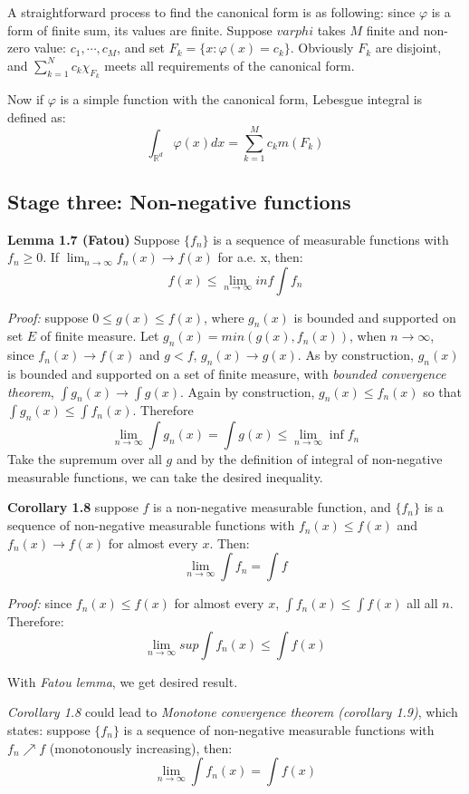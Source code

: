 \documentclass[
]{article}
\begin{document}
A straightforward process to find the canonical form is as following: since \(\varphi\) is a form of finite sum,
its values are finite. Suppose \(varphi\) takes \(M\) finite and non-zero value: \(c_1, \cdots, c_M\), and
set \(F_k=\{x: \varphi(x)=c_k\}\). Obviously \(F_k\) are disjoint, and \(\sum_{k=1}^Nc_k\chi_{F_k}\) meets all
requirements of the canonical form.

Now if \(\varphi\) is a simple function with the canonical form, Lebesgue integral is defined as:
\[\int_{\mathbb{R}^d}\varphi(x)dx=\sum_{k=1}^Mc_km(F_k)\]

\subsection{Stage three: Non-negative functions}
\textbf{Lemma 1.7 (Fatou)} Suppose \(\{f_n\}\) is a sequence of measurable functions with \(f_n \geq 0\). If 
\(\lim_{n\to\infty}f_n(x)\to f(x)\) for a.e. x, then:
\[f(x)\leq \lim_{n\to\infty}inf\int f_n\]

\textit{Proof:} suppose \(0\leq g(x) \leq f(x)\), where \(g_n(x)\) is bounded and supported on set \(E\)
of finite measure. Let \(g_n(x)=min(g(x), f_n(x))\), when \(n\to\infty\), since \(f_n(x)\to f(x)\) and \(g<f\),
\(g_n(x)\to g(x)\). As by construction, \(g_n(x)\) is bounded and supported on a set of finite measure, with \textit{bounded convergence theorem},
\(\int g_n(x)\to \int g(x)\). Again by construction, \(g_n(x)\leq f_n(x)\) so that \(\int g_n(x) \leq \int f_n(x)\). Therefore
\[
  \lim_{n\to\infty}\int g_n(x)=\int g(x) \leq \lim_{n\to\infty}\inf f_n
\]
Take the supremum over all \(g\) and by the definition of integral of non-negative measurable functions,
we can take the desired inequality.

\textbf{Corollary 1.8} suppose \(f\) is a non-negative measurable function, and \(\{f_n\}\) is a sequence
of non-negative measurable functions with \(f_n(x)\leq f(x)\) and \(f_n(x)\to f(x)\) for almost every \(x\). Then:
\[\lim_{n\to\infty}\int f_n = \int f\]

\textit{Proof:} since \(f_n(x)\leq f(x)\) for almost every \(x\), \(\int f_n(x)\leq \int f(x)\) all all \(n\). Therefore:
\[\lim_{n\to\infty}sup\int f_n(x)\leq\int f(x)\]

With \textit{Fatou lemma}, we get desired result.

\textit{Corollary 1.8} could lead to \textit{Monotone convergence theorem (corollary 1.9)}, which states: suppose
\(\{f_n\}\) is a sequence of non-negative measurable functions with \(f_n\nearrow f \) (monotonously increasing), then:
\[\lim_{n\to\infty}\int f_n(x)=\int f(x)\]
\end{document}
